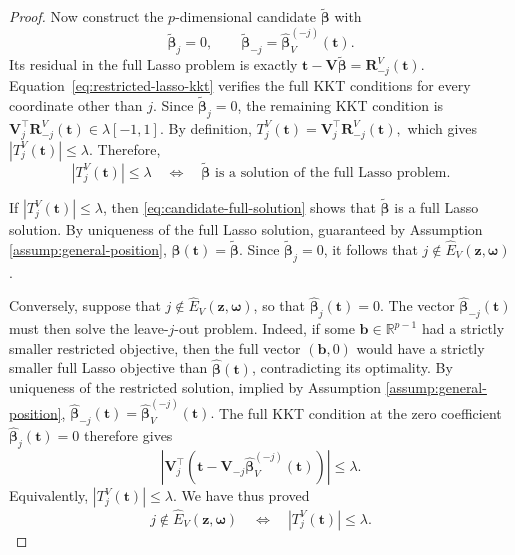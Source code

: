 \documentclass[12pt]{article}
\theoremstyle{definition}
\begin{document}
\begin{proof}
Now construct the $p$-dimensional candidate $\widetilde{\boldsymbol\beta}$ with
\[
    \widetilde{\boldsymbol\beta}_j=0,
    \qquad
    \widetilde{\boldsymbol\beta}_{-j}
    =
    \widehat{\boldsymbol\beta}_V^{(-j)}(\boldsymbol t).
\]
Its residual in the full Lasso problem is exactly
$
    \boldsymbol t-\boldsymbol V\widetilde{\boldsymbol\beta}
    =
    \boldsymbol R_{-j}^V(\boldsymbol t).
$
Equation~\eqref{eq:restricted-lasso-kkt} verifies the full KKT
conditions for every coordinate other than $j$. 
Since
$\widetilde{\boldsymbol\beta}_j=0$, the remaining KKT condition is
$
    \boldsymbol V_j^\top \boldsymbol R_{-j}^V(\boldsymbol t)\in\lambda[-1,1].$
By definition,
$
    T_j^V(\boldsymbol t)=\boldsymbol V_j^\top \boldsymbol R_{-j}^V(\boldsymbol t),
$
which gives
$
    |T_j^V(\boldsymbol t)|\le\lambda.
$
Therefore,
\begin{equation}
    |T_j^V(\boldsymbol t)|\le\lambda
    \quad\Longleftrightarrow\quad
    \widetilde{\boldsymbol\beta}
    \text{ is a solution of the full Lasso problem}.
    \label{eq:candidate-full-solution}
\end{equation}

If $|T_j^V(\boldsymbol t)|\le\lambda$, then
\eqref{eq:candidate-full-solution} shows that $\widetilde{\boldsymbol\beta}$ is a
full Lasso solution. By uniqueness of the full Lasso solution, guaranteed  by Assumption \ref{assump:general-position},
$
    \widehat{\boldsymbol\beta}(\boldsymbol t)=\widetilde{\boldsymbol\beta}.$
Since $\widetilde{\boldsymbol\beta}_j=0$, it follows that
$j\notin\widehat E_V(\boldsymbol z,\boldsymbol\omega)$.

Conversely, suppose that $j\notin\widehat E_V(\boldsymbol z,\boldsymbol\omega)$, so that
$\widehat{\boldsymbol\beta}_j(\boldsymbol t)=0$. The vector $\widehat{\boldsymbol\beta}_{-j}(\boldsymbol t)$ must then
solve the leave-$j$-out problem. Indeed, if some
$\boldsymbol b\in\mathbb R^{p-1}$ had a strictly smaller restricted objective,
then the full vector $(\boldsymbol b,0)$ would have a strictly smaller full Lasso
objective than $\widehat{\boldsymbol\beta}(\boldsymbol t)$, contradicting its optimality.
By uniqueness of the restricted solution, implied by Assumption \ref{assump:general-position},
$
    \widehat{\boldsymbol\beta}_{-j}(\boldsymbol t)
    =
    \widehat{\boldsymbol\beta}_V^{(-j)}(\boldsymbol t).
$
The full KKT condition at the zero coefficient
$\widehat{\boldsymbol\beta}_j(\boldsymbol t)=0$ therefore gives
\[
    \left|
        \boldsymbol V_j^\top
        \left(
            \boldsymbol t-\boldsymbol V_{-j}\widehat{\boldsymbol\beta}_V^{(-j)}(\boldsymbol t)
        \right)
    \right|
    \le\lambda.
\]
Equivalently, $|T_j^V(\boldsymbol t)|\le\lambda$. 
We have thus proved
\[
    j\notin\widehat E_V(\boldsymbol z,\boldsymbol\omega)
    \quad\Longleftrightarrow\quad
    |T_j^V(\boldsymbol t)|\le\lambda.
\]
\end{proof}
\end{document}
